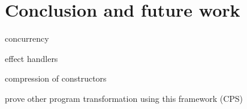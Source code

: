 \section{Conclusion and future work}

concurrency

effect handlers

compression of constructors

prove other program transformation using this framework (CPS)
